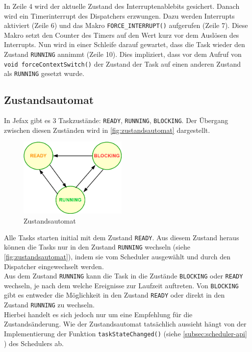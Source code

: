 \documentclass[fontsize=12pt, toc=bibliography, notitlepage]{scrreprt}
\newcommand{\refnn}[1]{\ref{#1} \nameref{#1}}
\begin{document}
In Zeile 4 wird der aktuelle Zustand des Interruptenablebits gesichert. Danach wird ein Timerinterrupt des Dispatchers erzwungen. Dazu werden Interrupts aktiviert (Zeile 6) und das Makro \lstinline$FORCE_INTERRUPT()$ aufgerufen (Zeile 7). Diese Makro setzt den Counter des Timers auf den Wert kurz vor dem Auslösen des Interrupts. Nun wird in einer Schleife darauf gewartet, dass die Task wieder den Zustand \lstinline$RUNNING$ annimmt (Zeile 10). Dies impliziert, dass vor dem Aufruf von \lstinline$void forceContextSwitch()$ der Zustand der Task auf einen anderen Zustand als \lstinline$RUNNING$ gesetzt wurde.

\subsection{Zustandsautomat}
\label{subsec:zustandsautomat}
In Jefax gibt es 3 Taskzustände: \lstinline$READY$, \lstinline$RUNNING$, \lstinline$BLOCKING$. Der Übergang zwischen diesen Zuständen wird in \autoref{fig:zustandsautomat} dargestellt.

\begin{figure}[H]
	\centering
	\includegraphics[width=200px]{images/Zustandsautomat.png}
	\caption{Zustandsautomat}
	\label{fig:zustandsautomat}
\end{figure}

Alle Tasks starten initial mit dem Zustand \lstinline$READY$. Aus diesem Zustand heraus können die Tasks nur in den Zustand \lstinline$RUNNING$ wechseln (siehe \autoref{fig:zustandsautomat}), indem sie vom Scheduler ausgewählt und durch den Dispatcher eingewechselt werden.\\

Aus dem Zustand \lstinline$RUNNING$ kann die Task in die Zustände \lstinline$BLOCKING$ oder \lstinline$READY$ wechseln, je nach dem welche Ereignisse zur Laufzeit auftreten. Von \lstinline$BLOCKING$ gibt es entweder die Möglichkeit in den Zustand \lstinline$READY$ oder direkt in den Zustand \lstinline$RUNNING$ zu wechseln.\\

Hierbei handelt es sich jedoch nur um eine Empfehlung für die Zustandsänderung. Wie der Zustandsautomat tatsächlich aussieht hängt von der Implementierung der Funktion \lstinline$taskStateChanged()$ (siehe \refnn{subsec:scheduler-api}) des Schedulers ab.
\end{document}
